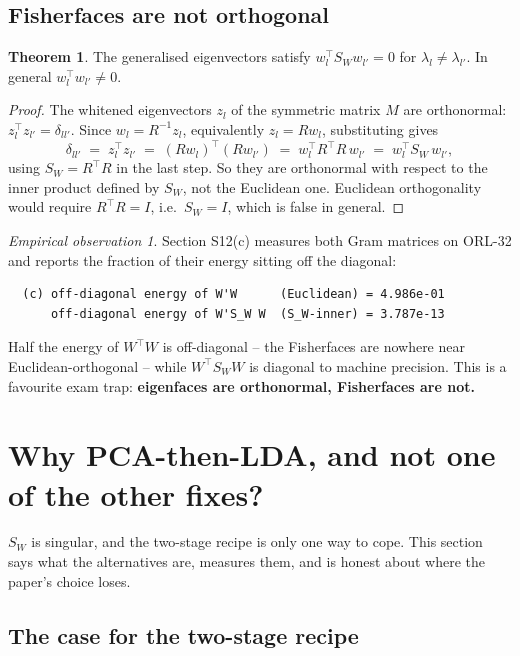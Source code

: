 \documentclass[11pt]{article}
\theoremstyle{definition}
\newtheorem{theorem}{Theorem}[section]
\theoremstyle{remark}
\newtheorem*{observation}{Empirical observation}
\newcommand{\Sw}{S_W}
\begin{document}
\subsection{Fisherfaces are not orthogonal}

\begin{theorem}
The generalised eigenvectors satisfy $w_l^{\!\top}\Sw w_{l'} = 0$ for $\lambda_l\neq\lambda_{l'}$.
In general $w_l^{\!\top} w_{l'} \neq 0$.
\end{theorem}
\begin{proof}
The whitened eigenvectors $z_l$ of the symmetric matrix $M$ are orthonormal:
$z_l^{\!\top} z_{l'}=\delta_{ll'}$. Since $w_l = R^{-1}z_l$, equivalently
$z_l = Rw_l$, substituting gives
\[
  \delta_{ll'} \;=\; z_l^{\!\top} z_{l'}
  \;=\; (Rw_l)^{\!\top}(Rw_{l'})
  \;=\; w_l^{\!\top} R^{\!\top} R\, w_{l'}
  \;=\; w_l^{\!\top}\Sw\, w_{l'} ,
\]
using $\Sw = R^{\!\top} R$ in the last step.
So they are orthonormal with respect to the inner product defined by $\Sw$, not the
Euclidean one. Euclidean orthogonality would require $R^{\!\top} R=I$, i.e.\ $\Sw=I$,
which is false in general.
\end{proof}

\begin{observation}
Section S12(c) measures both Gram matrices on ORL-32 and reports the fraction of
their energy sitting off the diagonal:
\begin{lstlisting}
  (c) off-diagonal energy of W'W      (Euclidean) = 4.986e-01
      off-diagonal energy of W'S_W W  (S_W-inner) = 3.787e-13
\end{lstlisting}
Half the energy of $W^{\!\top} W$ is off-diagonal -- the Fisherfaces are nowhere near
Euclidean-orthogonal -- while $W^{\!\top}\Sw W$ is diagonal to machine precision. This
is a favourite exam trap: \textbf{eigenfaces are orthonormal, Fisherfaces are
not.}
\end{observation}

\section{Why PCA-then-LDA, and not one of the other fixes?}
\label{sec:alternatives}

$\Sw$ is singular, and the two-stage recipe is only one way to cope. This section
says what the alternatives are, measures them, and is honest about where the
paper's choice loses.

\subsection{The case for the two-stage recipe}
\end{document}
